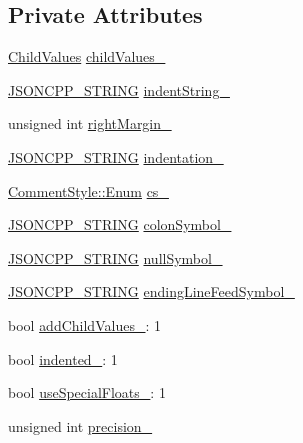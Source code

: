 \subsection*{Private Attributes}
\begin{DoxyCompactItemize}
\item 
\hyperlink{structJson_1_1BuiltStyledStreamWriter_a63196b38400e5ce452f65ce856d47b6f}{Child\+Values} \hyperlink{structJson_1_1BuiltStyledStreamWriter_a47d562d7874c5b1e68995bd62f575792}{child\+Values\+\_\+}
\item 
\hyperlink{json_8hpp_a1e723f95759de062585bc4a8fd3fa4be}{J\+S\+O\+N\+C\+P\+P\+\_\+\+S\+T\+R\+I\+NG} \hyperlink{structJson_1_1BuiltStyledStreamWriter_a0f8115a4fb474ab0e9de25f10e5ca09a}{indent\+String\+\_\+}
\item 
unsigned int \hyperlink{structJson_1_1BuiltStyledStreamWriter_a06a51521ccae20397f52fe3036edc602}{right\+Margin\+\_\+}
\item 
\hyperlink{json_8hpp_a1e723f95759de062585bc4a8fd3fa4be}{J\+S\+O\+N\+C\+P\+P\+\_\+\+S\+T\+R\+I\+NG} \hyperlink{structJson_1_1BuiltStyledStreamWriter_aaa4cbad91428ceca37cbabfc2a17a92d}{indentation\+\_\+}
\item 
\hyperlink{structJson_1_1CommentStyle_a51fc08f3518fd81eba12f340d19a3d0c}{Comment\+Style\+::\+Enum} \hyperlink{structJson_1_1BuiltStyledStreamWriter_a89a9c76c7531143b52785861ba21c1d4}{cs\+\_\+}
\item 
\hyperlink{json_8hpp_a1e723f95759de062585bc4a8fd3fa4be}{J\+S\+O\+N\+C\+P\+P\+\_\+\+S\+T\+R\+I\+NG} \hyperlink{structJson_1_1BuiltStyledStreamWriter_a9f10991ddef9b77d0b580e24e71483c6}{colon\+Symbol\+\_\+}
\item 
\hyperlink{json_8hpp_a1e723f95759de062585bc4a8fd3fa4be}{J\+S\+O\+N\+C\+P\+P\+\_\+\+S\+T\+R\+I\+NG} \hyperlink{structJson_1_1BuiltStyledStreamWriter_a6ccceadf4b1286a519a175cb59cb61d5}{null\+Symbol\+\_\+}
\item 
\hyperlink{json_8hpp_a1e723f95759de062585bc4a8fd3fa4be}{J\+S\+O\+N\+C\+P\+P\+\_\+\+S\+T\+R\+I\+NG} \hyperlink{structJson_1_1BuiltStyledStreamWriter_a5e61a9a4b2af52b98900286c843b86f7}{ending\+Line\+Feed\+Symbol\+\_\+}
\item 
bool \hyperlink{structJson_1_1BuiltStyledStreamWriter_abed9cc31da503b48798e7cea68c42e16}{add\+Child\+Values\+\_\+}\+: 1
\item 
bool \hyperlink{structJson_1_1BuiltStyledStreamWriter_a6aa0ad023e623f600103631a6bca6d10}{indented\+\_\+}\+: 1
\item 
bool \hyperlink{structJson_1_1BuiltStyledStreamWriter_a6f1b8694b4eb17ab8c34f6d6dd8c8a4a}{use\+Special\+Floats\+\_\+}\+: 1
\item 
unsigned int \hyperlink{structJson_1_1BuiltStyledStreamWriter_a6373d8d0ae4741b64e3904e4db0eef46}{precision\+\_\+}
\end{DoxyCompactItemize}


